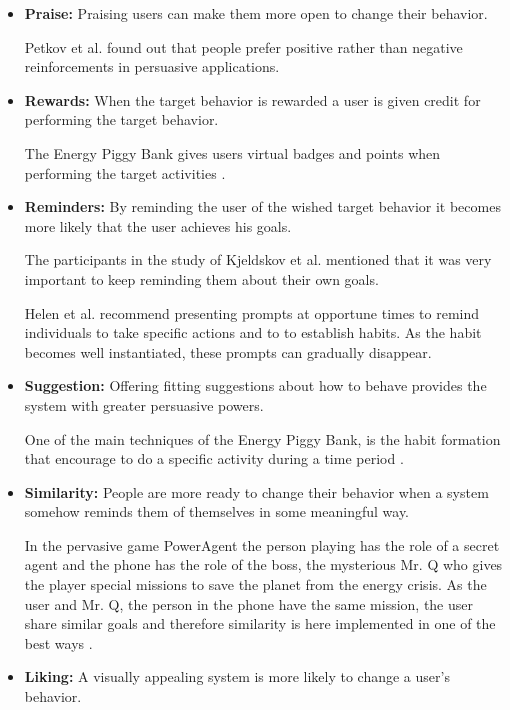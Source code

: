 \begin{itemize}
	\item \textbf{Praise:}
	Praising users can make them more open to change their behavior.
	
	Petkov et al. \cite{petkov2012personalised} found out that people prefer positive rather than negative reinforcements	in persuasive applications.
	\item \textbf{Rewards:}
	When the target behavior is rewarded a user is given credit for performing the target behavior.
	
	The Energy Piggy Bank gives users virtual badges and points when performing the target activities \cite{Bjorn1165339}. 
	\item \textbf{Reminders:}
	By reminding the user of the wished target behavior it becomes more likely that the user achieves his goals.
	
	The participants in the study of Kjeldskov et al. \cite{kjeldskov2012using} mentioned that it was very important to keep reminding them about their own goals.
	
	Helen et al. \cite{he2010one} recommend presenting prompts at opportune times to remind individuals to take specific actions and to to establish habits. As the habit becomes well instantiated, these prompts can gradually disappear.	
	
	\item \textbf{Suggestion:}
	Offering fitting suggestions about how to behave provides the system with greater persuasive powers.
	
	One of the main techniques of the Energy Piggy Bank, is the habit formation that encourage to do a specific activity during a time period \cite{Bjorn1165339}.
	\item \textbf{Similarity:}
	People are more ready to change their behavior when a system somehow reminds them of themselves in some meaningful way.
		
	In the pervasive game PowerAgent the person playing has the role of a secret agent and the phone has the role of the boss, the mysterious Mr. Q who gives the player special missions to save the planet from the energy crisis. As the user and Mr. Q, the person in the phone have the same mission, the user share similar goals and therefore similarity is here implemented in one of the best ways \cite{bang2007promoting}.

	\item \textbf{Liking:}
	A visually appealing system is more likely to change a user's behavior.
	

\end{itemize}

